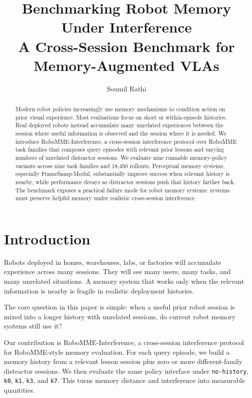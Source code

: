 \documentclass[10pt,letterpaper]{article}
\title{\vspace{-1.5em}Benchmarking Robot Memory Under Interference\\
\large A Cross-Session Benchmark for Memory-Augmented VLAs}
\author{Soumil Rathi}
\date{}
\begin{document}
\maketitle

\begin{abstract}
Modern robot policies increasingly use memory mechanisms to condition action on prior visual experience. Most evaluations focus on short or within-episode histories. Real deployed robots instead accumulate many unrelated experiences between the session where useful information is observed and the session where it is needed. We introduce RoboMME-Interference, a cross-session interference protocol over RoboMME task families that composes query episodes with relevant prior lessons and varying numbers of unrelated distractor sessions. We evaluate nine runnable memory-policy variants across nine task families and 18,450 rollouts. Perceptual memory systems, especially FrameSamp-Modul, substantially improve success when relevant history is nearby, while performance decays as distractor sessions push that history farther back. The benchmark exposes a practical failure mode for robot memory systems: systems must preserve helpful memory under realistic cross-session interference.
\end{abstract}

\section{Introduction}

Robots deployed in homes, warehouses, labs, or factories will accumulate experience across many sessions. They will see many users, many tasks, and many unrelated situations. A memory system that works only when the relevant information is nearby is fragile in realistic deployment histories.

The core question in this paper is simple: when a useful prior robot session is mixed into a longer history with unrelated sessions, do current robot memory systems still use it?

Our contribution is RoboMME-Interference, a cross-session interference protocol for RoboMME-style memory evaluation. For each query episode, we build a memory history from a relevant lesson session plus zero or more different-family distractor sessions. We then evaluate the same policy interface under \texttt{no-history}, \texttt{k0}, \texttt{k1}, \texttt{k3}, and \texttt{k7}. This turns memory distance and interference into measurable quantities.
\end{document}
